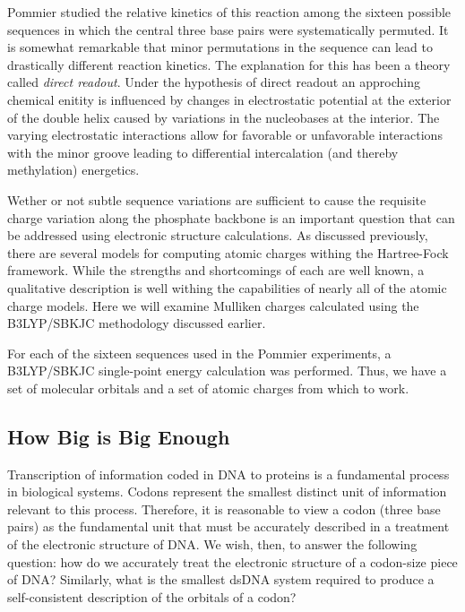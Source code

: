 Pommier\cite{Pommier96} studied the relative kinetics of this reaction
among the sixteen possible sequences in which the central three base
pairs were systematically permuted.  It is somewhat remarkable that
minor permutations in the sequence can lead to drastically different
reaction kinetics.  The explanation for this has been a theory called
\textit{direct readout}.\cite{Hurley98} Under the hypothesis of direct
readout an approching chemical enitity is
influenced by changes in electrostatic potential at the exterior of
the double helix caused by variations in the nucleobases at the
interior.  The varying electrostatic interactions allow for favorable
or unfavorable interactions with the minor groove leading to
differential intercalation (and thereby methylation) energetics.

Wether or not subtle sequence variations are sufficient to cause the
requisite charge variation along the phosphate backbone is an
important question that can be addressed using electronic structure
calculations.  As discussed previously, there are several models for
computing atomic charges withing the Hartree-Fock framework.  While
the strengths and shortcomings of each are well known, a qualitative
description is well withing the capabilities of nearly all of the
atomic charge models.  Here we will examine Mulliken charges
calculated using the B3LYP/SBKJC methodology discussed earlier.

For each of the sixteen sequences used in the Pommier experiments, a
B3LYP/SBKJC single-point energy calculation was performed.  Thus, we
have a set of molecular orbitals and a set of atomic charges from
which to work.




\subsection{How Big is Big Enough}
Transcription of information coded in DNA to proteins is a fundamental
process in biological systems.  Codons represent the smallest distinct
unit of information relevant to this process.  Therefore, it is
reasonable to view a codon (three base pairs) as the fundamental unit
that must be accurately described in a treatment of the electronic
structure of DNA.  We wish, then, to answer the following question:
how do we accurately treat the electronic structure of a codon-size
piece of DNA?  Similarly, what is the smallest dsDNA system required
to produce a self-consistent description of the orbitals of a codon?

